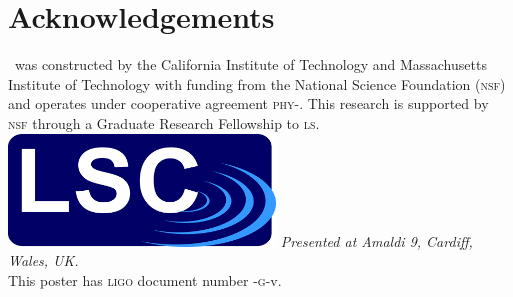 \documentclass[portrait,plainboxedsections]{sciposter}
\begin{document}
\begin{minipage}[t]{0.25\textwidth}


\end{minipage}%
\hspace{0.05\textwidth}%
\begin{minipage}[t]{0.7\textwidth}
\section*{Acknowledgements}

\LIGO\ was constructed by the California Institute of
Technology and Massachusetts Institute of Technology with funding from the
National Science Foundation (\textsc{nsf}) and operates under cooperative agreement
\textsc{phy}-. This research is supported by \textsc{nsf}
through a Graduate Research Fellowship to \textsc{ls}. \\
\newline\newline
\includegraphics[height=3cm]{figures/LSC_logo}\hspace{7.5mm}
\hspace{7.5mm}
\newline\newline
\emph{Presented at Amaldi 9, Cardiff, Wales, UK.} \\
This poster has \textsc{ligo} document number \LIGO{}-\textsc{g}-v.

\end{minipage}
\end{document}
